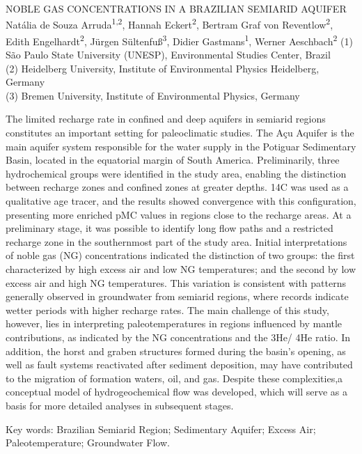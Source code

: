 \begin{conf-abstract}
{NOBLE GAS CONCENTRATIONS IN A BRAZILIAN SEMIARID AQUIFER}
{Natália de Souza Arruda\textsuperscript{1,2}, Hannah Eckert\textsuperscript{2}, Bertram Graf von Reventlow\textsuperscript{2}, Edith
Engelhardt\textsuperscript{2}, Jürgen Sültenfuß\textsuperscript{3}, Didier Gastmans\textsuperscript{1}, Werner Aeschbach\textsuperscript{2}}
{(1) São Paulo State University (UNESP), Environmental Studies Center, Brazil\\
(2) Heidelberg University, Institute of Environmental Physics Heidelberg, Germany\\
(3) Bremen University, Institute of Environmental Physics, Germany}
{The limited recharge rate in confined and deep aquifers in semiarid regions constitutes an
important setting for paleoclimatic studies. The Açu Aquifer is the main aquifer system
responsible for the water supply in the Potiguar Sedimentary Basin, located in the equatorial
margin of South America. Preliminarily, three hydrochemical groups were identified in the
study area, enabling the distinction between recharge zones and confined zones at greater
depths. 14C was used as a qualitative age tracer, and the results showed convergence with
this configuration, presenting more enriched pMC values in regions close to the recharge
areas. At a preliminary stage, it was possible to identify long flow paths and a restricted
recharge zone in the southernmost part of the study area. Initial interpretations of noble
gas (NG) concentrations indicated the distinction of two groups: the first characterized by
high excess air and low NG temperatures; and the second by low excess air and high NG
temperatures. This variation is consistent with patterns generally observed in groundwater
from semiarid regions, where records indicate wetter periods with higher recharge rates.
The main challenge of this study, however, lies in interpreting paleotemperatures in regions
influenced by mantle contributions, as indicated by the NG concentrations and the 3He/ 4He ratio. In addition, the horst and graben structures formed during the basin’s opening, as well as fault systems reactivated after sediment deposition, may have
contributed to the migration of formation waters, oil, and gas. Despite these complexities,a conceptual model of hydrogeochemical flow was developed, which will serve as a basis for more detailed analyses in subsequent stages.

Key words: Brazilian Semiarid Region; Sedimentary Aquifer; Excess Air; Paleotemperature;
Groundwater Flow.}
\end{conf-abstract}
